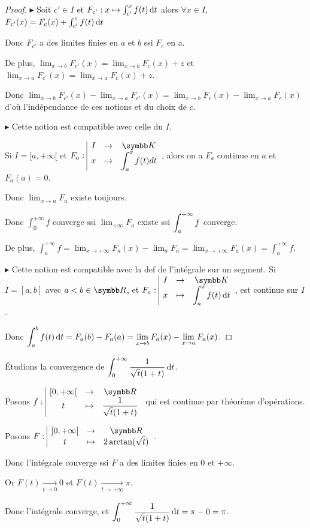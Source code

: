 \begin{proof}
    $\blacktriangleright$ Soit $c' \in I$ et $F_{c'} : x \mapsto \int_{c' }^{x } f(t) \,\mathrm{d}t$ alors 
    $\forall x \in I$, $F_{c'}(x) = F_c(x) + \int_{c'}^{c} f(t) \,\mathrm{d}t$ 

    Donc $F_{c'}$ a des limites finies en $a$ et $b$ ssi $F_c$ en a. 

    De plus, $\lim_{x \to b} F_{c'}(x) = \lim_{x \to b} F_c(x)  + z$ et 
    $\lim_{x \to a} F_{c'}(x) = \lim_{x \to a} F_c(x) + z$. 

    Donc $\lim_{x \to b} F_{c'}(x) - \lim_{x \to a} F_{c'}(x) = \lim_{x \to b} F_c(x) - \lim_{x \to a} F_c(x)$
    d'où l'indépendance de ces notions et du choix de $c$. 

    \lvspace $\blacktriangleright$ Cette notion est compatible avec celle du $I$. 

    Si $I =[a, + \infty[$ et $\fonction {F_a}{I}{\K}{x}{\int_a^x f(t) dt}$, alors on a 
    $F_a$ continue en $a$ et $F_a(a) = 0 $.
    
    Donc $\lim_{x \to a} F_a$ existe toujours. 

    Donc $\int_{0}^{+ \infty   } f$ converge ssi $\lim_{+\infty   } F_a$ existe ssi 
    $\displaystyle \int_{a }^{+ \infty   } f$ converge.

    De plus, $\int_{a }^{+ \infty   } f = \lim_{x \to + \infty   } F_a(x) - \lim_{a } F_a = \lim_{x \to + \infty  } F_a(x) = \int_{a }^{+ \infty   } f$.


    \lvspace $\blacktriangleright$ Cette notion est compatible avec la def de l'intégrale sur un segment. 
    Si $I = [a, b]$ avec $a < b \in \R$, et $\fonction{F_a}{I}{\K}{x}{\int_a^x f(t) \dt}$, 
    est continue sur $I$.

    Donc $\displaystyle \int_{a }^{b } f(t) \,\mathrm{d}t = F_a(b) - F_a(a) = \lim_{x \to b} F_a(x) - \lim_{x \to a} F_a(x)$.
\end{proof}

\begin{exemple}
    Étudions la convergence de $\displaystyle \int_0^{+ \infty} \frac 1 {\sqrt t (1 + t)} \,\mathrm{d}t$.

    Posons $\fonction f {[0, + \infty[}{\R}{t}{\frac 1 {\sqrt t (1 + t)}}$ qui est continue par théorème d'opérations.

    Posons $\fonction{F}{]0, + \infty[}{\R}{t}{2 \arctan(\sqrt t)}$.

    Donc l'intégrale converge ssi $F$ a des limites finies en $0$ et $+\infty$.

    Or $F(t) \xrightarrow[t \to 0   ]{} 0$ et $F(t) \xrightarrow[t \to + \infty   ]{} \pi$.

    Donc l'intégrale converge, et $\displaystyle \int_{0}^{+ \infty   } \frac 1 {\sqrt t (1 + t)} \,\mathrm{d}t = \pi - 0 = \pi$.
\end{exemple}


